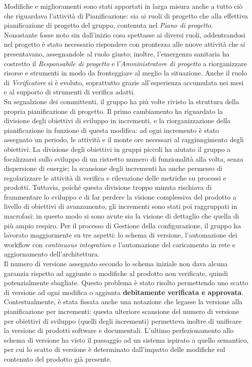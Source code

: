 	\newline
	Modifiche e miglioramenti sono stati apportati in larga misura anche a tutto ciò che riguardava l'attività di Pianificazione: sia ai ruoli di progetto che alla effettiva pianificazione di progetto del gruppo, contenuta nel \textit{Piano di progetto}.
	\\Nonostante fosse noto sin dall'inizio cosa spettasse ai diversi ruoli, addentrandosi nel progetto è stato necessario rispondere con prontezza alle nuove attività che si presentavano, assegnandole al ruolo giusto; inoltre, l'emergenza sanitaria ha costretto il \textit{Responsabile di progetto} e l'\textit{Amministratore di progetto} a riorganizzare risorse e strumenti in modo da fronteggiare al meglio la situazione. Anche il ruolo di \textit{Verificatore} si è evoluto, soprattutto grazie all'esperienza accumulata nei mesi e al supporto di strumenti di verifica adatti.
	\\Su segnalzione dei committenti, il gruppo ha più volte rivisto la struttura della propria pianificazione di progetto. Il primo cambiamento ha riguardato la divisione degli obiettivi di sviluppo in incrementi, e la riorganizzazione della pianificazione in funzione di questa modifica: ad ogni incremento è stato assegnato un periodo, le attività e il monte ore necessari al raggiungimento degli obiettivi. La divisione degli obiettivi in gruppi piccoli ha aiutato il gruppo a focalizzarsi sullo sviluppo di un ristretto numero di funzionalità alla volta, senza dispersione di energie; la scansione degli incrementi ha anche permesso di regolarizzare le attività di verifica e rilevazione delle metriche su processi e prodotti. Tuttavia, poiché questa divisione troppo minuta rischiava di frammentare lo sviluppo e di far perdere la visione complessiva del prodotto a livello di obiettivi di avanzamento, gli incrementi sono stati poi raggruppati in macrofasi: in questo modo si sono avute sia la visione di dettaglio che quella di più ampio respiro.
	\newline
	Per il processo di Gestione della  configurazione, il gruppo ha lavorato maggiormente su tre aspetti: lo schema di versione, l'automazione dei workflow con \textit{continuous integration} e l'automazione del caricamento in rete e aggiornamento dell'architettura.
	\\Il numero di versione assegnato secondo lo schema iniziale non dava alcuna garanzia rispetto ad aggiunte o modifiche al prodotto non verificate, quindi potenzialmente sbagliate. Questo problema è stato risolto permettendo uno scatto di versione ad ogni modifica o aggiunta \textbf{debitamente verificata e approvata}. Contestualmente, è stata fissata anche una notazione che legasse la versione alla pianificazione per incrementi: questa ulteriore scansione del numero di versione per obiettivi di sviluppo (quelli degli incrementi) permetteva inoltre di unificare la versione di prodotti software e documentali. L'ultimo perfezionamento allo schema di versione ha visto il passaggio ad un sistema ispirato a quello semantico, per cui lo scatto di versione è determinato dall'impatto delle modifiche sul contenuto del prodotto già presente.
